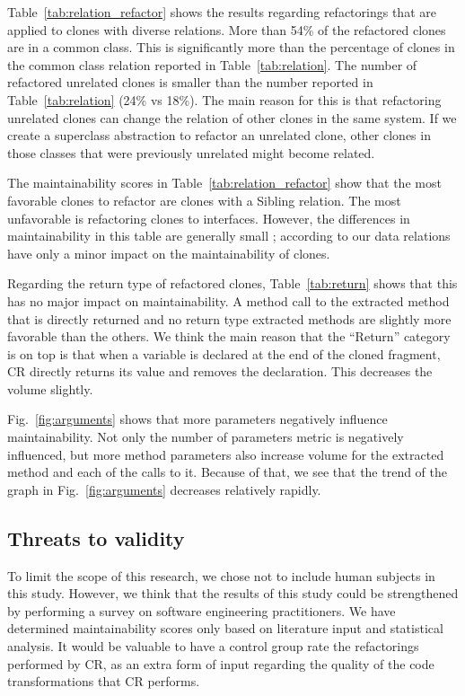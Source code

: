 \documentclass[sigconf,review,anonymous]{acmart}
\begin{document}
Table~\ref{tab:relation_refactor} shows the results regarding refactorings that are applied to clones with diverse relations. More than 54\% of the refactored clones are in a common class. This is significantly more than the percentage of clones in the common class relation reported in Table~\ref{tab:relation}. The number of refactored unrelated clones is smaller than the number reported in Table~\ref{tab:relation} (24\% vs 18\%). The main reason for this is that refactoring unrelated clones can change the relation of other clones in the same system. If we create a superclass abstraction to refactor an unrelated clone, other clones in those classes that were previously unrelated might become related.

The maintainability scores in Table~\ref{tab:relation_refactor} show that the most favorable clones to refactor are clones with a Sibling relation. The most unfavorable is refactoring clones to interfaces. However, the differences in maintainability in this table are generally small %
; according to our data relations have only a minor impact on the maintainability of clones.

Regarding the return type of refactored clones, Table~\ref{tab:return} shows that this has no major impact on maintainability. A method call to the extracted method that is directly returned and no return type extracted methods are slightly more favorable than the others. We think the main reason that the ``Return'' category is on top is that when a variable is declared at the end of the cloned fragment, CR directly returns its value and removes the declaration. This decreases the volume slightly.

Fig.~\ref{fig:arguments} shows that more parameters negatively influence maintainability. Not only the %
number of parameters metric is negatively influenced, but more method parameters also increase volume for the extracted method and each of the calls to it. Because of that, we see that the trend of the graph in Fig.~\ref{fig:arguments} decreases relatively rapidly.

\subsection{Threats to validity}
To limit the scope of this research, we chose not to include human subjects in this study. However, we think that the results of this study could be strengthened by performing a survey on software engineering practitioners. We have determined maintainability scores only based on literature input and statistical analysis. It would be valuable to have a control group rate the refactorings performed by CR, as an extra form of input regarding the quality of the code transformations that CR performs.
\end{document}
